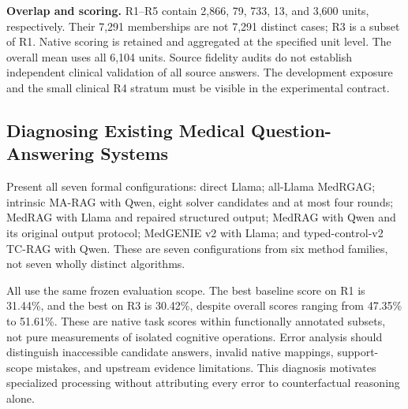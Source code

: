 \documentclass[11pt,a4paper]{article}
\begin{document}


\textbf{Overlap and scoring.} R1--R5 contain 2,866, 79, 733, 13, and 3,600 units, respectively. Their 7,291 memberships are not 7,291 distinct cases; R3 is a subset of R1. Native scoring is retained and aggregated at the specified unit level. The overall mean uses all 6,104 units. Source fidelity audits do not establish independent clinical validation of all source answers. The development exposure and the small clinical R4 stratum must be visible in the experimental contract.

\subsection{Diagnosing Existing Medical Question-Answering Systems}
Present all seven formal configurations: direct Llama; all-Llama MedRGAG; intrinsic MA-RAG with Qwen, eight solver candidates and at most four rounds; MedRAG with Llama and repaired structured output; MedRAG with Qwen and its original output protocol; MedGENIE v2 with Llama; and typed-control-v2 TC-RAG with Qwen. These are seven configurations from six method families, not seven wholly distinct algorithms.

All use the same frozen evaluation scope. The best baseline score on R1 is 31.44\%, and the best on R3 is 30.42\%, despite overall scores ranging from 47.35\% to 51.61\%. These are native task scores within functionally annotated subsets, not pure measurements of isolated cognitive operations. Error analysis should distinguish inaccessible candidate answers, invalid native mappings, support-scope mistakes, and upstream evidence limitations. This diagnosis motivates specialized processing without attributing every error to counterfactual reasoning alone.
\end{document}
